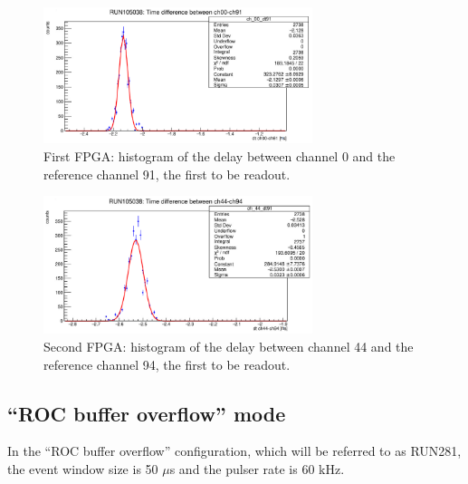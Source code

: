   \begin{figure}[!h]
          \centering
      \includegraphics[width=0.7\textwidth]{figures/png/Screenshot from 2023-12-03 11-50-50.png}
      \caption{First FPGA: histogram of the delay between channel 0 and the reference channel 91, the first to be readout.}
      \label{fig:delay1}
    \end{figure}
    \begin{figure}[!h]
          \centering
      \includegraphics[width=0.7\textwidth]{figures/png/Screenshot from 2023-12-03 11-50-33.png}
      \caption{Second FPGA: histogram of the delay between channel 44 and the reference channel 94, the first to be readout.}
      \label{fig:delay2}
    \end{figure}
\subsection{``ROC buffer overflow'' mode}
In the ``ROC buffer overflow'' configuration, which will be referred to as RUN281, the event window size is 50 $\mu$s
and the pulser rate is 60 kHz.
